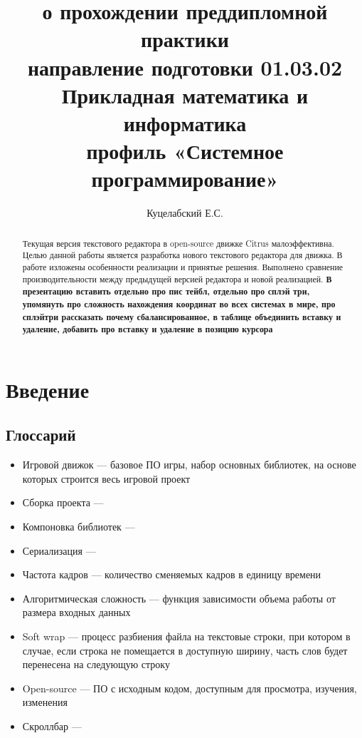 \documentclass{fefu}
\begin{document}
	\title{о прохождении преддипломной практики\\направление подготовки 01.03.02 
	Прикладная математика и информатика\\профиль «Системное программирование»}
	\author{Куцелабский Е.С.}
	
	\makereporttitle
	\tableofcontents
	\newpage
	
	\begin{abstract}
		\par Текущая версия текстового редактора в open-source движке Citrus малоэффективна.
		Целью данной работы является разработка нового текстового редактора для 
		движка. В работе изложены особенности реализации и принятые решения.
		Выполнено сравнение производительности между предыдущей версией редактора и
		новой реализацией.
		\textbf{В презентацию вставить отдельно про пис тейбл, отдельно про сплэй три, упомянуть
		про сложность нахождения координат во всех системах в мире, про сплэйтри рассказать
		почему сбалансированное, в таблице объединить вставку и удаление, добавить про 
		вставку и удаление в позицию курсора}
	\end{abstract}

	\section{Введение}
		\subsection{Глоссарий}
			\begin{itemize}
				\item Игровой движок --- базовое ПО игры, набор основных библиотек, на основе
				которых строится весь игровой проект
				\item Сборка проекта ---
				\item Компоновка библиотек ---
				\item Сериализация ---
				\item Частота кадров --- количество сменяемых кадров в единицу времени
				\item Алгоритмическая сложность --- функция зависимости объема работы от 
				размера входных данных
				\item Soft wrap --- процесс разбиения файла на текстовые строки, при котором
				в случае, если строка не помещается в доступную ширину, часть слов будет
				перенесена на следующую строку
				\item Open-source --- ПО с исходным кодом, доступным для просмотра, изучения, 
				изменения
				\item Скроллбар ---
			\end{itemize}
\end{document}
